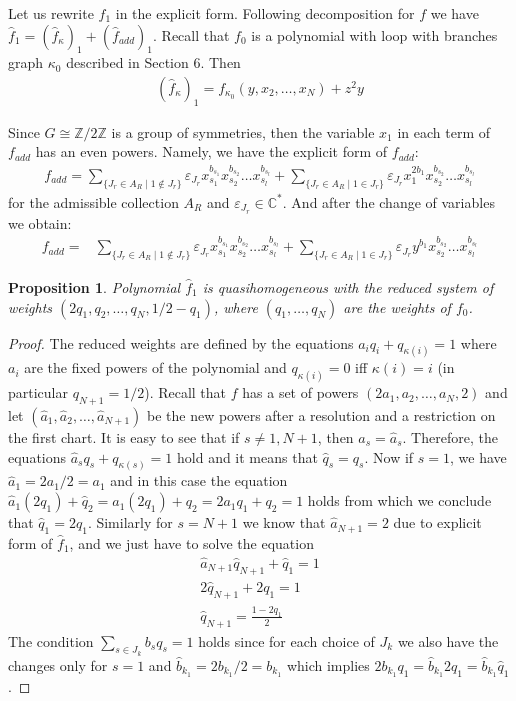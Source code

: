 \documentclass[reqno,12pt]{amsart}
\numberwithin{equation}{section}
\theoremstyle{plain}
\newtheorem{proposition}[theorem]{Proposition}
\theoremstyle{definition}
\newcommand{\CC}{{\mathbb{C}}}
\newcommand{\ZZ}{{\mathbb{Z}}}
\begin{document}
Let us rewrite $\hat{f}_{1}$ in the explicit form. Following decomposition for $f$ we have  $\hat{f}_{1}= (\hat{f}_\kappa)_{1} + (\hat{f}_{add})_{1}$. Recall that $f_0$ is a polynomial with loop with branches graph $\kappa_0$ described in Section 6. Then 
\begin{align}\label{exform}
(\hat{f}_\kappa)_{1} = f_{\kappa_0}(y, x_{2}, \dots,x_N) + z^2y
\end{align}

Since $G \cong \ZZ/2\ZZ$ is a group of symmetries, then the variable $x_1$ in each term of $f_{add}$ has an even powers. Namely, we have the explicit form of $f_{add}$: 
\begin{align*}
f_{add} = \sum_{\{J_r \in A_R\;|\;
1 \notin J_r \}} \varepsilon_{J_r}x_{s_1}^{b_{s_1}}x_{s_2}^{b_{s_2}} \dots x_{s_l}^{b_{s_l}} + \sum_{\{J_r \in A_R\;|\;
1 \in J_r\}} \varepsilon_{J_r}x_{1}^{2b_1}x_{s_2}^{b_{s_2}} \dots x_{s_l}^{b_{s_l}}
\end{align*}
for the admissible collection $A_R$ and $\varepsilon_{J_r} \in \CC^*$. And after the change of variables we obtain:
\begin{align*}
f_{add} =& \sum_{\{J_r \in A_R\;|\;
1 \notin J_r\}} \varepsilon_{J_r}x_{s_1}^{b_{s_1}}x_{s_2}^{b_{s_2}} \dots x_{s_l}^{b_{s_l}} + \sum_{\{J_r \in A_R\;|\;
1 \in J_r\}} \varepsilon_{J_r}y^{b_1}x_{s_2}^{b_{s_2}} \dots x_{s_l}^{b_{s_l}}
\end{align*}
\begin{proposition}
    Polynomial $\hat{f}_1$ is quasihomogeneous with the reduced system of weights $(2q_1, q_{2}, \dots, q_N, 1/2 - q_1)$, where $(q_1, \dots, q_N)$ are the weights of $f_0$.
\end{proposition}
\begin{proof}
The reduced weights are defined by the equations $a_iq_i + q_{\kappa(i)} = 1$ where $a_i$ are the fixed powers of the polynomial and $q_{\kappa(i)} = 0$ iff $\kappa(i) = i$ (in particular $q_{N+1} = 1/2$). Recall that $f$ has a set of powers $(2a_1, a_2, \dots, a_N, 2)$ and let $(\hat{a}_1, \hat{a}_2, \dots, \hat{a}_{N+1})$ be the new powers after a resolution and a restriction on the first chart. It is easy to see that if $s \neq 1,N+1$, then $a_s = \hat{a}_s$. Therefore, the equations $\hat{a}_sq_s + q_{\kappa(s)} = 1$ hold and it means that $\hat{q}_s = q_s$. Now if $s=1$, we have $\hat{a}_1 = 2a_1/2 = a_1$ and in this case the equation $\hat{a}_{1}(2q_1) + \hat{q}_{2} = a_1(2q_1) + q_{2} = 2a_1q_1 + q_{2} = 1$ holds from which we conclude that $\hat{q}_1 = 2q_1$. Similarly for $s = N+ 1$ we know that $\hat{a}_{N+1} = 2$ due to explicit form of $\hat{f}_{1}$, and we just have to solve the equation \begin{align*}
    \hat{a}_{N+1}\hat{q}_{N+1} + \hat{q}_{1} = 1 \\
    2\hat{q}_{N+1} + 2q_1 = 1 \\
    \hat{q}_{N+1} = \frac{1-2q_1}{2}
\end{align*} 
The condition $\sum_{s \in J_k} b_{s}q_{s} = 1$ holds since for each choice of $J_k$ we also have the changes only for $s=1$ and $\hat{b}_{k_1} = 2b_{k_1}/2= b_{k_1}$ which implies $2b_{k_1}q_1 = \hat{b}_{k_1}2q_1 = \hat{b}_{k_1}\hat{q}_1$.
\end{proof}
\end{document}

